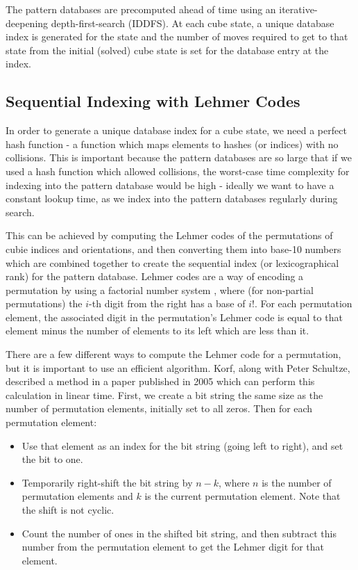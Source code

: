 The pattern databases are precomputed ahead of time using an iterative-deepening depth-first-search (IDDFS). At each cube state, a unique database index is generated for the state and the number of moves required to get to that state from the initial (solved) cube state is set for the database entry at the index.

\subsection{Sequential Indexing with Lehmer Codes}
\label{subsection:lehmercodes}
In order to generate a unique database index for a cube state, we need a perfect hash function - a function which maps elements to hashes (or indices) with no collisions. This is important because the pattern databases are so large that if we used a hash function which allowed collisions, the worst-case time complexity for indexing into the pattern database would be high - ideally we want to have a constant lookup time, as we index into the pattern databases regularly during search. 

This can be achieved by computing the Lehmer codes \cite{lehmer} of the permutations of cubie indices and orientations, and then converting them into base-10 numbers which are combined together to create the sequential index (or lexicographical rank) for the pattern database. Lehmer codes are a way of encoding a permutation by using a factorial number system \cite{factorial}, where (for non-partial permutations) the $i$-th digit from the right has a base of $i!$. For each permutation element, the associated digit in the permutation's Lehmer code is equal to that element minus the number of elements to its left which are less than it.

There are a few different ways to compute the Lehmer code for a permutation, but it is important to use an efficient algorithm. Korf, along with Peter Schultze, described a method in a paper published in 2005 \cite{permutationalg} which can perform this calculation in linear time. First, we create a bit string the same size as the number of permutation elements, initially set to all zeros. Then for each permutation element:
\begin{itemize}
    \item Use that element as an index for the bit string (going left to right), and set the bit to one.
    \item Temporarily right-shift the bit string by $n-k$, where $n$ is the number of permutation elements and $k$ is the current permutation element. Note that the shift is not cyclic.
    \item Count the number of ones in the shifted bit string, and then subtract this number from the permutation element to get the Lehmer digit for that element.
\end{itemize} 

